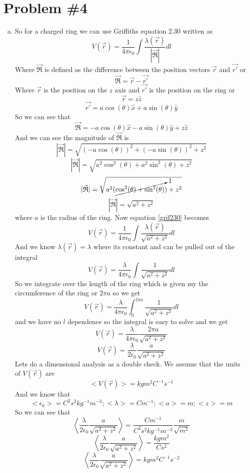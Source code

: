 \documentclass[11pt]{article}
\numberwithin{equation}{section}
\newcommand{\scrptR}{\vec{\mathfrak{R}}}
\begin{document}
\section{Problem \#4}
\begin{enumerate}[(a)]
\item
So for a charged ring we can use Griffiths equation 2.30 written as
\begin{equation}
V(\vec{r}) = \frac{1}{4\pi\epsilon_0}\int\frac{\lambda(\vec{r})}{|\scrptR|}dl
\label{grif230}
\end{equation}
Where $\scrptR$ is defined as the difference between the position vectors $\vec{r}$ and $\vec{r'}$ or
$$\scrptR = \vec{r}-\vec{r'}$$
Where $\vec{r}$ is the position on the $z$ axis and $\vec{r'}$ is the position on the ring or
$$\vec{r} = z\hat{z}$$
$$\vec{r'} = a\cos(\theta)\hat{x}+a\sin(\theta)\hat{y}$$
So we can see that 
$$\scrptR = - a\cos(\theta)\hat{x} - a\sin(\theta)\hat{y} + z\hat{z} $$
And we can see the magnitude of $\scrptR$ is 
$$|\scrptR| = \sqrt{(-a\cos(\theta))^2 + (-a\sin(\theta))^2 + z^2}$$
$$|\scrptR| = \sqrt{a^2\cos^2(\theta) + a^2\sin^2(\theta) + z^2}$$
$$|\scrptR| = \sqrt{a^2(\cancelto{1}{\cos^2(\theta) + \sin^2(\theta)}) + z^2}$$
$$|\scrptR| = \sqrt{a^2 + z^2}$$
where $a$ is the radius of the ring. Now equation \ref{grif230} becomes
$$V(\vec{r}) = \frac{1}{4\pi\epsilon_0}\int\frac{\lambda(\vec{r})}{\sqrt{a^2 + z^2}}dl$$
And we know $\lambda(\vec{r}) = \lambda$ where its constant and can be pulled out of the integral
$$V(\vec{r}) = \frac{\lambda}{4\pi\epsilon_0}\int\frac{1}{\sqrt{a^2 + z^2}}dl$$
So we integrate over the length of the ring which is given my the circumference of the ring or $2\pi a$ so we get
$$V(\vec{r}) = \frac{\lambda}{4\pi\epsilon_0}\int_0^{2\pi a}\frac{1}{\sqrt{a^2 + z^2}}dl$$
and we have no $l$ dependence so the integral is easy to solve and we get
$$V(\vec{r}) = \frac{\lambda}{4\pi\epsilon_0}\frac{2\pi a}{\sqrt{a^2 + z^2}}$$
$$V(\vec{r}) = \frac{\lambda}{2\epsilon_0}\frac{ a}{\sqrt{a^2 + z^2}}$$
Lets do a dimensional analysis as a double check. We assume that the units of $V(\vec{r})$ are
$$<V(\vec{r})> = kg m^2 C^{-1} s^{-1}$$
And we know that
$$<\epsilon_0> = C^2 s^2 kg^{-1} m^{-3}; <\lambda> = C m^{-1}; <a> = m; <z>=m$$
So we can see that
$$\left<\frac{\lambda}{2\epsilon_0}\frac{ a}{\sqrt{a^2 + z^2}}\right> = \frac{C m^{-1}}{C^2 s^2 kg^{-1} m^{-3}}\frac{m}{\sqrt{m^2}}$$
$$\left<\frac{\lambda}{2\epsilon_0}\frac{ a}{\sqrt{a^2 + z^2}}\right> = \frac{kg m^2}{C s^2}$$
$$\left<\frac{\lambda}{2\epsilon_0}\frac{ a}{\sqrt{a^2 + z^2}}\right> = kg m^2 C^{-1} s^{-2}$$

\end{enumerate}
\end{document}
